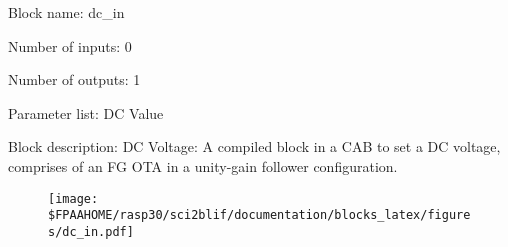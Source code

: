 \pagebreak

Block name: dc\_in

Number of inputs: 0

Number of outputs: 1

Parameter list: DC Value

Block description: 
DC Voltage: A compiled block in a CAB to set a DC voltage, comprises of an FG OTA in a unity-gain follower configuration.

\begin{figure}[H]  %
\texttt{[image: \$FPAAHOME/rasp30/sci2blif/documentation/blocks\_latex/figures/dc\_in.pdf]}
\end{figure}

